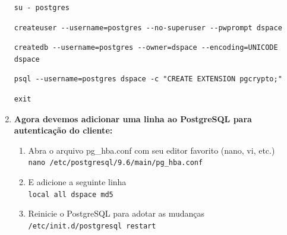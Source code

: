 \documentclass[12pt,hidelinks]{article}
\begin{document}
\begin{enumerate}
            \begin{verbatim}
su - postgres
            \end{verbatim}
            
            \begin{verbatim}
createuser --username=postgres --no-superuser --pwprompt dspace
            \end{verbatim}
            
            \begin{verbatim}
createdb --username=postgres --owner=dspace --encoding=UNICODE dspace
            \end{verbatim}
            
            \begin{verbatim}
psql --username=postgres dspace -c "CREATE EXTENSION pgcrypto;"
            \end{verbatim}
            
             \begin{verbatim}
exit
            \end{verbatim}
            
        \item \textbf{Agora devemos adicionar uma linha ao PostgreSQL para autenticação do cliente:}\\
    
        \begin{enumerate}
            \item Abra o arquivo pg\_hba.conf com seu editor favorito (nano, vi, etc.)\\
            
                \texttt{nano /etc/postgresql/9.6/main/pg\_hba.conf}\\

            \item E adicione a seguinte linha\\
            
                \texttt{local     all     dspace    md5}\\
                
             \item Reinicie o PostgreSQL para adotar as mudanças\\
            
                \texttt{/etc/init.d/postgresql restart}\\

            \end{enumerate}
            

\end{enumerate}
\end{document}
